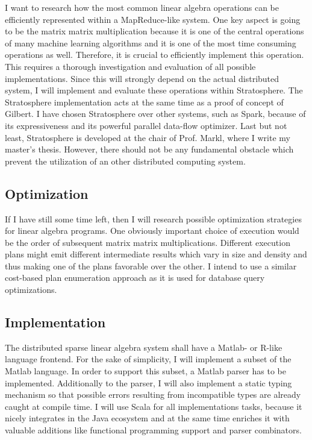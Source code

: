 \documentclass{dima}
\begin{document}
I want to research how the most common linear algebra operations can be efficiently represented within a MapReduce-like system.
One key aspect is going to be the matrix matrix multiplication because it is one of the central operations of many machine learning algorithms and it is one of the most time consuming operations as well.
Therefore, it is crucial to efficiently implement this operation.
This requires a thorough investigation and evaluation of all possible implementations.
Since this will strongly depend on the actual distributed system, I will implement and evaluate these operations within Stratosphere.
The Stratosphere implementation acts at the same time as a proof of concept of Gilbert.
I have chosen Stratosphere over other systems, such as Spark, because of its expressiveness and its powerful parallel data-flow optimizer.
Last but not least, Stratosphere is developed at the chair of Prof. Markl, where I write my master's thesis.
However, there should not be any fundamental obstacle which prevent the utilization of an other distributed computing system.

\subsection{Optimization}

If I have still some time left, then I will research possible optimization strategies for linear algebra programs.
One obviously important choice of execution would be the order of subsequent matrix matrix multiplications.
Different execution plans might emit different intermediate results which vary in size and density and thus making one of the plans favorable over the other.
I intend to use a similar cost-based plan enumeration approach as it is used for database query optimizations.

\subsection{Implementation}

The distributed sparse linear algebra system shall have a Matlab- or R-like language frontend.
For the sake of simplicity, I will implement a subset of the Matlab language.
In order to support this subset, a Matlab parser has to be implemented.
Additionally to the parser, I will also implement a static typing mechanism so that possible errors resulting from incompatible types are already caught at compile time.
I will use Scala for all implementations tasks, because it nicely integrates in the Java ecosystem and at the same time enriches it with valuable additions like functional programming support and parser combinators.
\end{document}
